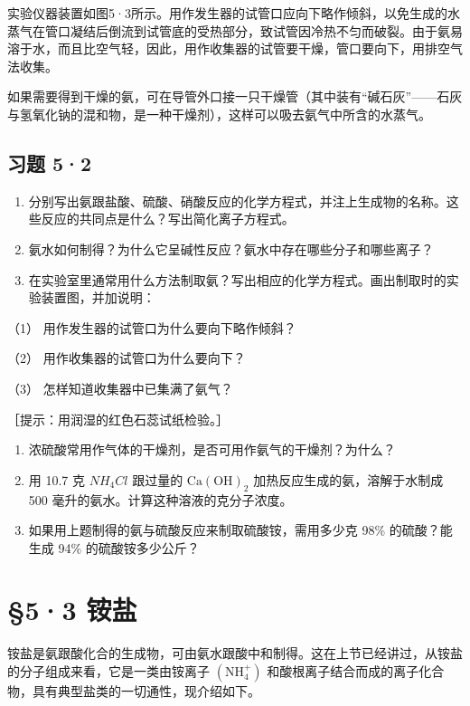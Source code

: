 实验仪器装置如图5·3所示。用作发生器的试管口应向下略作倾斜，以免生成的水蒸气在管口凝结后倒流到试管底的受热部分，致试管因冷热不匀而破裂。由于氨易溶于水，而且比空气轻，因此，用作收集器的试管要干燥，管口要向下，用排空气法收集。

如果需要得到干燥的氨，可在导管外口接一只干燥管（其中装有``碱石灰''------石灰与氢氧化钠的混和物，是一种干燥剂），这样可以吸去氨气中所含的水蒸气。

\subsection{习题 5·2}

\begin{enumerate}
\item
  分别写出氨跟盐酸、硫酸、硝酸反应的化学方程式，并注上生成物的名称。这些反应的共同点是什么？写出简化离子方程式。
\item
  氨水如何制得？为什么它呈碱性反应？氨水中存在哪些分子和哪些离子？
\item
  在实验室里通常用什么方法制取氨？写出相应的化学方程式。画出制取时的实验装置图，并加说明：
\end{enumerate}

（1） 用作发生器的试管口为什么要向下略作倾斜？

（2） 用作收集器的试管口为什么要向下？

（3） 怎样知道收集器中已集满了氨气？

［提示：用润湿的红色石蕊试纸检验。］

\begin{enumerate}[start=4]
\item
  浓硫酸常用作气体的干燥剂，是否可用作氨气的干燥剂？为什么？
\item
  用 10.7 克 \(NH_{4}Cl\) 跟过量的 \(\mathrm{Ca(OH)}_{2}\)
  加热反应生成的氨，溶解于水制成 500
  毫升的氨水。计算这种溶液的克分子浓度。
\item
  如果用上题制得的氨与硫酸反应来制取硫酸铵，需用多少克 98\%
  的硫酸？能生成 94\% 的硫酸铵多少公斤？
\end{enumerate}

\section{§5·3 铵盐}

铵盐是氨跟酸化合的生成物，可由氨水跟酸中和制得。这在上节已经讲过，从铵盐的分子组成来看，它是一类由铵离子
\(\left(\mathrm{NH}_{4}^{+}\right)\)
和酸根离子结合而成的离子化合物，具有典型盐类的一切通性，现介绍如下。

